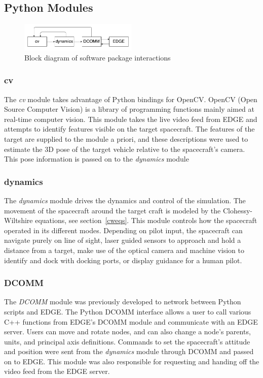 \documentclass[journal, 10pt]{IEEEtran}
\begin{document}
\subsection{Python Modules}
\begin{figure}[tbh]
\begin{center}
\includegraphics[width=0.5\textwidth]{figures/block.pdf}
\caption{Block diagram of software package interactions}
\label{c1_plot}
\end{center}
\end{figure}

\subsubsection{cv}
The \textit{cv} module takes advantage of Python bindings for OpenCV. OpenCV (Open Source Computer Vision) is a library of programming functions mainly aimed at real-time computer vision. This module takes the live video feed from EDGE and attempts to identify features visible on the target spacecraft. The features of the target are supplied to the module a priori, and these descriptions were used to estimate the 3D pose of the target vehicle relative to the spacecraft's camera. This pose information is passed on to the \textit{dynamics} module

\subsubsection{dynamics}
The \textit{dynamics} module drives the dynamics and control of the simulation. The movement of the spacecraft around the target craft is modeled by the Clohessy-Wiltshire equations, see section~\ref{cweqs}. This module controls how the spacecraft operated in its different modes. Depending on pilot input, the spacecraft can navigate purely on line of sight, laser guided sensors to approach and hold a distance from a target, make use of the optical camera and machine vision to identify and dock with docking ports, or display guidance for a human pilot.

\subsubsection{DCOMM}
The \textit{DCOMM} module was previously developed to network between Python scripts and EDGE. The Python DCOMM interface allows a user to call various C++ functions from EDGE's DCOMM module and communicate with an EDGE server. Users can move and rotate nodes, and can also change a node's parents, units, and principal axis definitions. Commands to set the spacecraft's attitude and position were sent from the \textit{dynamics} module through DCOMM and passed on to EDGE. This module was also responsible for requesting and handing off the video feed from the EDGE server.
\end{document}
